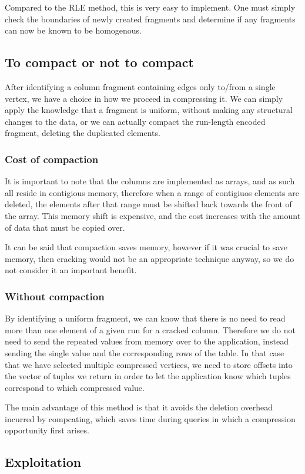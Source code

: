 Compared to the RLE method, this is very easy to implement. One must simply check the boundaries of
newly created fragments and determine if any fragments can now be known to be homogenous.

\subsection{To compact or not to compact}

After identifying a column fragment containing edges only to/from a single vertex, we have a choice 
in how we proceed in compressing it. We can simply apply the knowledge that a fragment is uniform,
without making any structural changes to the data, or we can actually compact the run-length
encoded fragment, deleting the duplicated elements.

\subsubsection{Cost of compaction}

It is important to note that the columns are implemented as arrays, and as such all reside in
contigious memory, therefore when a range of contigiuos elements are deleted, the elements after
that range must be shifted back towards the front of the array. This memory shift is expensive,
and the cost increases with the amount of data that must be copied over.

It can be said that compaction saves memory, however if it was crucial to save memory, then cracking
would not be an appropriate technique anyway, so we do not consider it an important benefit.

\subsubsection{Without compaction}

By identifying a uniform fragment, we can know that there is no need to read more than one element
of a given run for a cracked column. Therefore we do not need to send the repeated values from
memory over to the application, instead sending the single value and the corresponding rows of the
table. In that case that we have selected multiple compressed vertices, we need to store offsets
into the vector of tuples we return in order to let the application know which tuples correspond to
which compressed value.

The main advantage of this method is that it avoids the deletion overhead incurred by compcating,
which saves time during queries in which a compression opportunity first arises.

\subsection{Exploitation}

\label{ss:compressionexploitation}
